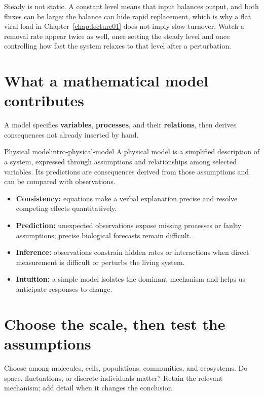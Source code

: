 \begin{remark}
Steady is not static. A constant level means that input balances output, and both fluxes can be large: the balance can hide rapid replacement, which is why a flat viral load in Chapter~\ref{chap:lecture01} does not imply slow turnover. Watch a removal rate appear twice as well, once setting the steady level and once controlling how fast the system relaxes to that level after a perturbation.
\end{remark}

\section{What a mathematical model contributes}\label{sec:intro-model-purpose}
A model specifies \textbf{variables}, \textbf{processes}, and their \textbf{relations}, then derives consequences not already inserted by hand.
\begin{definition}{Physical model}{intro-physical-model}
A physical model is a simplified description of a system, expressed through assumptions and relationships among selected variables. Its predictions are consequences derived from those assumptions and can be compared with observations.
\end{definition}
\begin{itemize}
\item \textbf{Consistency:} equations make a verbal explanation precise and resolve competing effects quantitatively.
\item \textbf{Prediction:} unexpected observations expose missing processes or faulty assumptions; precise biological forecasts remain difficult.
\item \textbf{Inference:} observations constrain hidden rates or interactions when direct measurement is difficult or perturbs the living system.
\item \textbf{Intuition:} a simple model isolates the dominant mechanism and helps us anticipate responses to change.
\end{itemize}

\section{Choose the scale, then test the assumptions}\label{sec:intro-description}
Choose among molecules, cells, populations, communities, and ecosystems. Do space, fluctuations, or discrete individuals matter? Retain the relevant mechanism; add detail when it changes the conclusion.

